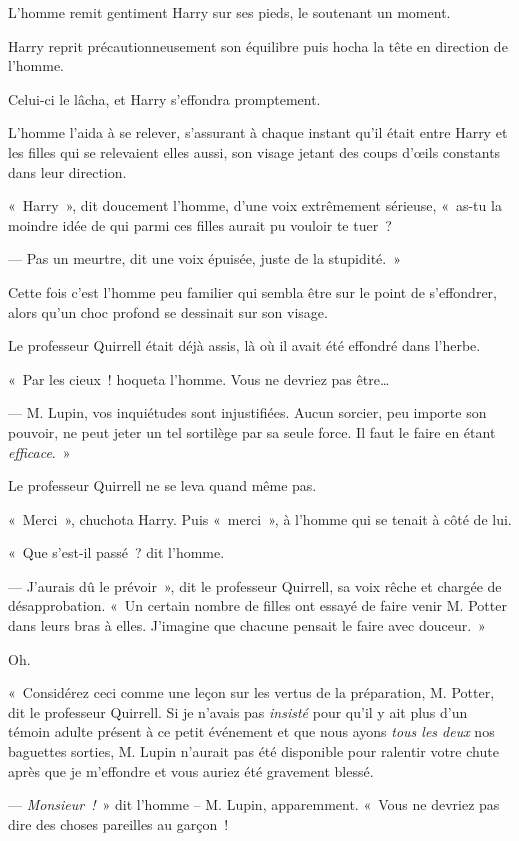 L'homme remit gentiment Harry sur ses pieds, le soutenant un moment.

Harry reprit précautionneusement son équilibre puis hocha la tête en direction de l'homme.

Celui-ci le lâcha, et Harry s'effondra promptement.

L'homme l'aida à se relever, s'assurant à chaque instant qu'il était entre Harry et les filles qui se relevaient elles aussi, son visage jetant des coups d'œils constants dans leur direction.

«~Harry~», dit doucement l'homme, d'une voix extrêmement sérieuse, «~as-tu la moindre idée de qui parmi ces filles aurait pu vouloir te tuer~?

--- Pas un meurtre, dit une voix épuisée, juste de la stupidité.~»

Cette fois c'est l'homme peu familier qui sembla être sur le point de s'effondrer, alors qu'un choc profond se dessinait sur son visage.

Le professeur Quirrell était déjà assis, là où il avait été effondré dans l'herbe.

«~Par les cieux~! hoqueta l'homme. Vous ne devriez pas être…

--- M. Lupin, vos inquiétudes sont injustifiées. Aucun sorcier, peu importe son pouvoir, ne peut jeter un tel sortilège par sa seule force. Il faut le faire en étant \emph{efficace}.~»

Le professeur Quirrell ne se leva quand même pas.

«~Merci~», chuchota Harry. Puis «~merci~», à l'homme qui se tenait à côté de lui.

«~Que s'est-il passé~? dit l'homme.

--- J'aurais dû le prévoir~», dit le professeur Quirrell, sa voix rêche et chargée de désapprobation. «~Un certain nombre de filles ont essayé de faire venir M. Potter dans leurs bras à elles. J'imagine que chacune pensait le faire avec douceur.~»

Oh.

«~Considérez ceci comme une leçon sur les vertus de la préparation, M. Potter, dit le professeur Quirrell. Si je n'avais pas \emph{insisté} pour qu'il y ait plus d'un témoin adulte présent à ce petit événement et que nous ayons \emph{tous les deux} nos baguettes sorties, M. Lupin n'aurait pas été disponible pour ralentir votre chute après que je m'effondre et vous auriez été gravement blessé.

--- \emph{Monsieur~!}~» dit l'homme -- M. Lupin, apparemment. «~Vous ne devriez pas dire des choses pareilles au garçon~!

